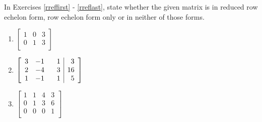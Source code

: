 \documentclass{ximera}
\begin{document}
	\author{Stitz-Zeager}


\label{ExercisesforAugMatrices}

In Exercises \ref{rreffirst} - \ref{rreflast}, state whether the given matrix is in reduced row echelon form, row echelon form only or in neither of those forms.

\begin{multicols}{3} 
\begin{enumerate}


\item $\left[ \begin{array}{rr|r} 
1 & 0 & 3 \\ 
0 & 1 & 3  \\ 
\end{array} \right]$ \label{rreffirst}

\item $\left[ \begin{array}{rrr|r} 
3 & -1 & \hphantom{-}1 & 3 \\ 
2 & -4 & 3 & 16 \\ 
1 & -1 & 1 & 5  \\
\end{array} \right]$

\item $\left[ \begin{array}{rrr|r} 
1 & 1 & 4 & 3 \\ 
0 & 1 & 3 & 6 \\ 
0 & 0 & 0 & 1  \\
\end{array} \right]$

\setcounter{HW}{\value{enumi}}
\end{enumerate}
\end{multicols}
\end{document}
